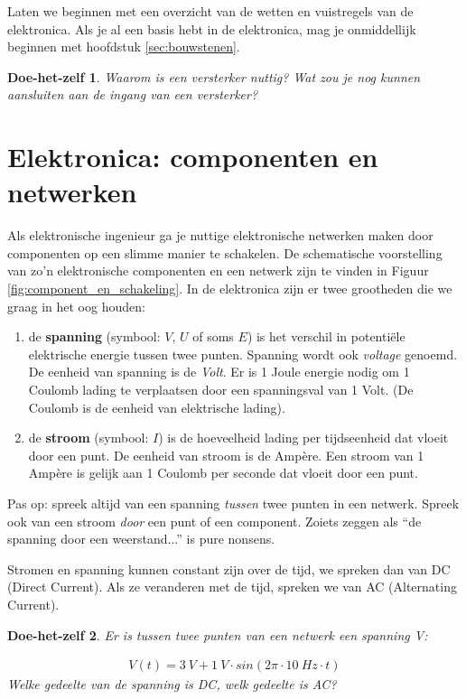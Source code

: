 \documentclass{article}
\newtheorem{DIY}{Doe-het-zelf}
\begin{document}
		Laten we beginnen met een overzicht van de wetten en vuistregels van de elektronica. Als je al een basis hebt in de elektronica, mag je onmiddellijk beginnen met hoofdstuk \ref{sec:bouwstenen}.
		\begin{DIY}
			Waarom is een versterker nuttig? Wat zou je nog kunnen aansluiten aan de ingang van een versterker?
		\end{DIY}
	\section{Elektronica: componenten en netwerken}

		Als elektronische ingenieur ga je nuttige elektronische netwerken maken door componenten op een slimme manier te schakelen. De schematische voorstelling van zo'n elektronische componenten en een netwerk zijn te vinden in Figuur \ref{fig:component_en_schakeling}. In de elektronica zijn er twee grootheden die we graag in het oog houden:

		\begin{enumerate}
			\item de \textbf{spanning} (symbool: $V$, $U$ of soms $E$) is het verschil in potenti\"ele elektrische energie tussen twee punten. Spanning wordt ook \emph{voltage} genoemd. De eenheid van spanning is de \emph{Volt}. Er is 1 Joule energie nodig om 1 Coulomb lading te verplaatsen door een spanningsval van 1 Volt. (De Coulomb is de eenheid van elektrische lading).

			\item de \textbf{stroom} (symbool: $I$) is de hoeveelheid lading per tijdseenheid dat vloeit door een punt. De eenheid van stroom is de Amp\`ere. Een stroom van 1 Amp\`ere is gelijk aan 1 Coulomb per seconde dat vloeit door een punt.
		\end{enumerate}

		Pas op: spreek altijd van een spanning \emph{tussen} twee punten in een netwerk. Spreek ook van een stroom \emph{door} een punt of een component. Zoiets zeggen als ``de spanning door een weerstand...'' is pure nonsens.

		Stromen en spanning kunnen constant zijn over de tijd, we spreken dan van DC (Direct Current). Als ze veranderen met de tijd, spreken we van AC (Alternating Current).
		\begin{DIY}
			Er is tussen twee punten van een netwerk een spanning V:

			\begin{align*}
			    V(t)  = 3~V + 1~V \cdot sin(2\pi \cdot 10~Hz \cdot t)
			\end{align*}
			Welke gedeelte van de spanning is DC, welk gedeelte is AC?
		\end{DIY}
\end{document}

